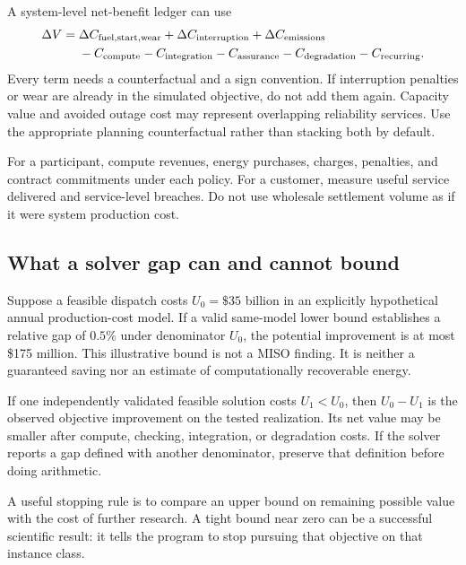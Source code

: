 \documentclass[11pt,letterpaper]{article}
\begin{document}
A system-level net-benefit ledger can use
\begin{equation}
\begin{aligned}
 \Delta V={}&\Delta C_{\rm fuel,start,wear}+\Delta C_{\rm interruption}
 +\Delta C_{\rm emissions}\\
 &-C_{\rm compute}-C_{\rm integration}-C_{\rm assurance}
 -C_{\rm degradation}-C_{\rm recurring}.
\end{aligned}
 \label{eq:value}
\end{equation}
Every term needs a counterfactual and a sign convention. If interruption penalties or wear are already in the simulated objective, do not add them again. Capacity value and avoided outage cost may represent overlapping reliability services. Use the appropriate planning counterfactual rather than stacking both by default.

For a participant, compute revenues, energy purchases, charges, penalties, and contract commitments under each policy. For a customer, measure useful service delivered and service-level breaches. Do not use wholesale settlement volume as if it were system production cost.

\subsection{What a solver gap can and cannot bound}
Suppose a feasible dispatch costs $U_0=\$35$ billion in an explicitly hypothetical annual production-cost model. If a valid same-model lower bound establishes a relative gap of $0.5\%$ under denominator $U_0$, the potential improvement is at most \$175 million. This illustrative bound is not a MISO finding. It is neither a guaranteed saving nor an estimate of computationally recoverable energy.

If one independently validated feasible solution costs $U_1<U_0$, then $U_0-U_1$ is the observed objective improvement on the tested realization. Its net value may be smaller after compute, checking, integration, or degradation costs. If the solver reports a gap defined with another denominator, preserve that definition before doing arithmetic.

A useful stopping rule is to compare an upper bound on remaining possible value with the cost of further research. A tight bound near zero can be a successful scientific result: it tells the program to stop pursuing that objective on that instance class.
\end{document}
